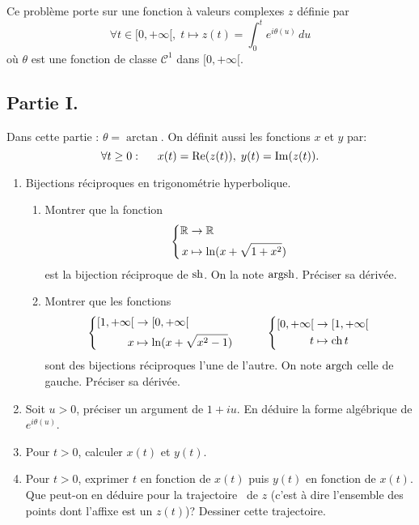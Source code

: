 Ce problème porte sur une fonction à valeurs complexes $z$ définie par
\begin{displaymath}
  \forall t\in [0,+\infty[, \; t \mapsto z(t) = \int_0^{t}e^{i\theta(u)}\,du
\end{displaymath}
où $\theta$ est une fonction de classe $\mathcal{C}^1$ dans $[0,+\infty[$.
\subsection*{Partie I.}
Dans cette partie : $\theta = \arctan$. On définit aussi les fonctions $x$ et $y$ par:
\begin{displaymath}
  \forall t \geq 0:\hspace{0.5cm} x(t) = \Re(z(t)),\; y(t) = \Im(z(t)) .
\end{displaymath}

\begin{enumerate}
  \item Bijections réciproques en trigonométrie hyperbolique.
\begin{enumerate}
  \item Montrer que la fonction
\begin{displaymath}
  \left\lbrace 
  \begin{aligned}
    \R &\rightarrow \R \\ x &\mapsto \ln(x+\sqrt{1+x^2})
  \end{aligned}
\right. 
\end{displaymath}
est la bijection réciproque de $\sh$. On la note $\argsh$. Préciser sa dérivée.

  \item Montrer que les fonctions
\[
  \left\lbrace 
  \begin{aligned}
    \left[ 1,+\infty\right[  &\rightarrow \left[ 0,+\infty \right[  \\ x &\mapsto \ln(x+\sqrt{x^2 -1})
  \end{aligned}
\right. \hspace{1cm}
  \left\lbrace 
  \begin{aligned}
     \left[ 0,+\infty \right[ &\rightarrow \left[ 1,+\infty\right[  \\ t &\mapsto \ch t
  \end{aligned}
\right.
\]
sont des bijections réciproques l'une de l'autre. On note $\argch$ celle de gauche. Préciser sa dérivée.
\end{enumerate}

\item Soit $u>0$, préciser un argument de $1+iu$. En déduire la forme algébrique de $e^{i\theta(u)}$.

\item Pour $t>0$, calculer $x(t)$ et $y(t)$.

\item Pour $t>0$, exprimer $t$ en fonction de $x(t)$ puis $y(t)$ en fonction de $x(t)$. Que peut-on en déduire pour la \og trajectoire\fg~ de $z$ (c'est à dire l'ensemble des points dont l'affixe est un $z(t)$)? Dessiner cette trajectoire. 
\end{enumerate}

